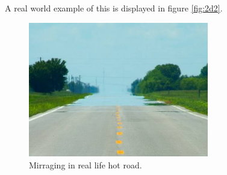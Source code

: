 \documentclass[12pt,twoside]{article}
\begin{document}
A real world example of this is displayed in figure \vref{fig:2d2}.
\begin{figure}
  \centering
  \includegraphics[width=0.7\textwidth]{../figures/picture.jpg}
  \caption{Mirraging in real life hot road.}
  \label{fig:2d2}
\end{figure}
%
%
\end{document}

